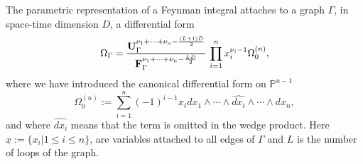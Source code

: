 \documentclass[a4paper,12pt]{article}
\numberwithin{equation}{section}
\numberwithin{figure}{section}
\begin{document}
The parametric representation of a Feynman integral attaches to a
graph $\Gamma$, in space-time dimension $D$, a differential form 
\begin{equation}\label{e:OmegaDef}
  \Omega_\Gamma = { \textbf{U}_\Gamma ^{\nu_1+\cdots+\nu_n-{(L+1)D\over2}}  \over \textbf{F}_\Gamma ^{\nu_1+\cdots+\nu_n-{LD\over2}} }\, \prod_{i=1}^n x_i^{\nu_i-1} \Omega^{(n)}_0,
\end{equation}
where we have introduced the  canonical differential form on
$\mathbb P^{n-1}$ 
% 
\begin{equation}
	\Omega_0^{(n)}:=  \sum_{i=1}^n (-1)^{i-1} x_i dx_1\wedge \cdots \wedge \widehat{dx_i} \wedge\cdots \wedge dx_n ,
\end{equation}
and where  $\widehat{dx_i}$ means that the term is omitted in the wedge
product.
Here  $\underline x:=\{x_i |1\leq i\leq n\}$,  are  variables attached to all edges of
$\Gamma$ and $L$ is the number of loops of the graph.
\end{document}
